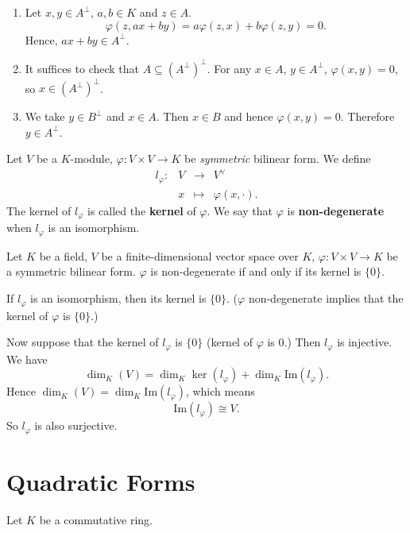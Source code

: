 \begin{proofenv}
    \quad
    \begin{enumerate}
        \item Let $x,y\in A^\perp$, $a,b\in K$ and $z\in A$.
        $$ \varphi\left(z, ax+by\right) = a \varphi \left(z,x\right) + b \varphi \left(z,y\right) = 0.$$
        Hence, $ax+by\in A^\perp$.
        \item It suffices to check that $A\subseteq \left(A^\perp\right)^\perp$. For any $x\in A$, $y\in A^\perp$, $\varphi(x,y) = 0$, so $x\in \left(A^\perp\right)^\perp$.
        \item We take $y \in B^\perp$ and $x\in A$. Then $x\in B$ and hence $\varphi(x,y)=0$. Therefore $y\in A^\perp$.
    \end{enumerate}
\end{proofenv}

\begin{definitionenv}
    Let $V$ be a $K$-module, $\varphi:V\times V\rightarrow K$ be \textit{symmetric} bilinear form.
    We define
    $$
    \begin{array}{rrcl}
        l_\varphi : & V& \rightarrow & V^\vee\\
        & x &\mapsto & \varphi(x,\cdot).
    \end{array}
    $$
    The kernel of $l_\varphi$ is called the \textbf{kernel} of $\varphi$.
    We say that $\varphi$ is \textbf{non-degenerate} when $l_\varphi$ is an isomorphism.
\end{definitionenv}
\begin{theoremenv}
    Let $K$ be a field, $V$ be a finite-dimensional vector space over $K$, $\varphi : V\times V\rightarrow K$ be a symmetric bilinear form.
    $\varphi$ is non-degenerate if and only if its kernel is $\{0\}$.
\end{theoremenv}
\begin{proofenv}
    If $l_\varphi$ is an isomorphism, then its kernel is $\{0\}$. ($\varphi$ non-degenerate implies that the kernel of $\varphi$ is $\{0\}$.)

    \quad Now suppose that the kernel of $l_\varphi$ is $\{0\}$ (kernel of $\varphi$ is $0$.) Then $l_\varphi$ is injective. We have 
    $$ \dim_{K}(V) = \dim_{K} \ker(l_\varphi) + \dim_{K} \mathrm{Im}(l_\varphi).$$
    Hence $\dim_{K}(V) = \dim_{K} \mathrm{Im}(l_\varphi)$, which means
    $$ \mathrm{Im}(l_\varphi) \cong  V.$$
    So $l_\varphi$ is also surjective.
\end{proofenv}

\section{Quadratic Forms}
\quad Let $K$ be a commutative ring.


